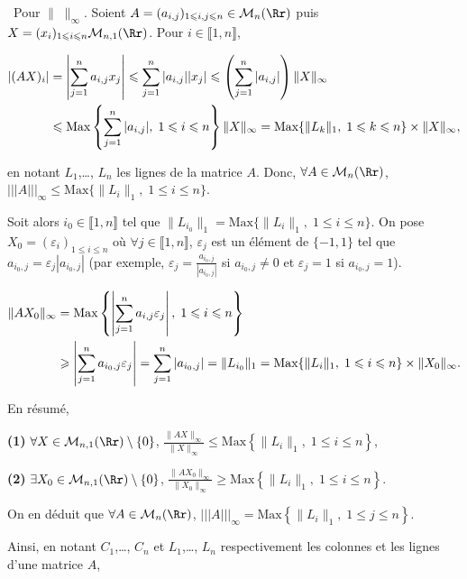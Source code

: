 {{\textbullet~Pour $\|\;\|_\infty$. Soient $A=(a_{i,j})_{1\leqslant i,j\leqslant n}\in\mathcal{M}_n(\Rr)$ puis $X=(x_i)_{1\leqslant i\leqslant n}\mathcal{M}_{n,1}(\Rr)$. Pour $i\in\llbracket1,n\rrbracket$,

\begin{align*}\ensuremath
|(AX)_i|&=\left|\sum_{j=1}^{n}a_{i,j}x_j\right|\leqslant\sum_{j=1}^{n}|a_{i,j}||x_j|\leqslant\left(\sum_{j=1}^{n}|a_{i,j}|\right)\|X\|_\infty\\
 &\leqslant\text{Max}\left\{\sum_{j=1}^{n}|a_{i,j}|,\;1\leqslant i\leqslant n\right\}\|X\|_\infty=\text{Max}\{\|L_k\|_1,\;1\leqslant k\leqslant n\}\times\|X\|_\infty,
\end{align*}

en notant $L_1$,\ldots, $L_n$ les lignes de la matrice $A$. Donc, $\forall A\in\mathcal{M}_n(\Rr)$, $|||A|||_\infty\leqslant\text{Max}\{\|L_i\|_1,\;1\leqslant i\leqslant n\}$.

Soit alors $i_0\in\llbracket1,n\rrbracket$ tel que $\|L_{i_0}\|_1=\text{Max}\{\|L_i\|_1,\;1\leqslant i\leqslant n\}$. On pose $X_{0}=\left(\varepsilon_i\right)_{1\leqslant i\leqslant n}$ où $\forall j\in\llbracket 1,n\rrbracket$, $\varepsilon_j$ est un élément de $\{-1,1\}$ tel que $a_{i_0,j}=\varepsilon_j|a_{i_0,j}|$ (par exemple, $\varepsilon_j= \frac{a_{i_0,j}}{|a_{i_0,j}|}$ si $a_{i_0,j}\neq0$ et $\varepsilon_j=1$ si $a_{i_0,j}=1$).

\begin{align*}\ensuremath
\|AX_0\|_\infty&=\text{Max}\left\{\left|\sum_{j=1}^{n}a_{i,j}\varepsilon_j\right|,\;1\leqslant i\leqslant n\right\}\\
 &\geqslant\left|\sum_{j=1}^{n}a_{i_0,j}\varepsilon_j\right|=\sum_{j=1}^{n}|a_{i_0,j}|=\|L_{i_0}\|_1
=\text{Max}\{\|L_i\|_1,\;1\leqslant i\leqslant n\}\times\|X_0\|_\infty.
\end{align*}

En résumé,

\textbf{(1)} $\forall X\in\mathcal{M}_{n,1}(\Rr)\setminus\{0\}$, $ \frac{\|AX\|_\infty}{\|X\|_\infty}\leqslant\text{Max}\left\{\|L_i\|_1,\;1\leqslant i\leqslant n\right\}$,

\textbf{(2)} $\exists X_0\in\mathcal{M}_{n,1}(\Rr)\setminus\{0\}$, $ \frac{\|AX_0\|_\infty}{\|X_0\|_\infty}\geqslant\text{Max}\left\{\|L_i\|_1,\;1\leqslant i\leqslant n\right\}$.

On en déduit que $\forall A\in\mathcal{M}_n(\Rr)$, $|||A|||_\infty=\text{Max}\left\{\|L_i\|_1,\;1\leqslant j\leqslant n\right\}$.

Ainsi, en notant $C_1$,\ldots, $C_n$ et $L_1$,\ldots, $L_n$ respectivement les colonnes et les lignes d'une matrice $A$,

\begin{center}
\end{center}
}
}
